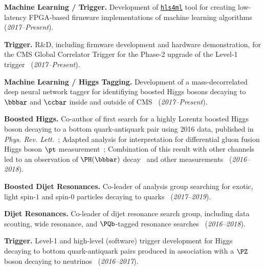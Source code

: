 \documentclass{res}
\begin{document}
\begin{resume}
  \textbf{Machine Learning / Trigger.} Development of \href{https://fastmachinelearning.org/hls4ml/}{\texttt{hls4ml}} tool for creating low-latency FPGA-based firmware implementations of machine learning algorithms~\cite{Elabd:2021lgo,Deiana:2021niw,Govorkova:2021utb,Iiyama:2020wap,Heintz:2020soy,DiGuglielmo:2020eqx,Summers:2020xiy,neurips2019_hls4ml,Duarte:2018ite} (\textit{2017--Present}).

  \textbf{Trigger.} R\&D, including firmware development and hardware demonstration, for the CMS Global Correlator Trigger for the Phase-2 upgrade of the Level-1 trigger~\cite{CERN-LHCC-2020-004} (\emph{2017--Present}).

  \textbf{Machine Learning / Higgs Tagging.} Development of a mass-decorrelated deep neural network tagger for identifiying boosted Higgs bosons decaying to $\bbbar$ and $\ccbar$ inside and outside of  CMS~\cite{Moreno:2019neq,Moreno:2019bmu,neurips2019_hbb,CMS-DP-2018-046} (\textit{2017--Present}).

  \textbf{Boosted Higgs.} Co-author of first search for a highly Lorentz boosted Higgs boson decaying to a bottom quark-antiquark pair using 2016 data, published in \emph{Phys. Rev. Lett.}~\cite{Sirunyan:2017dgc}; Adapted analysis for interpretation for differential gluon fusion Higgs boson $\pt$ measurement~\cite{Sirunyan:2018sgc}; Combination of this result with other channels led to an observation of $\PH(\bbbar)$ decay~\cite{Sirunyan:2018kst} and other measurements~\cite{Sirunyan:2018koj} (\textit{2016--2018}).

  \textbf{Boosted Dijet Resonances.} Co-leader of analysis group searching for exotic, light spin-$1$ and spin-$0$ particles decaying to quarks~\cite{Sirunyan:2019vxa,Sirunyan:2019sgo,Sirunyan:2018ikr,Sirunyan:2017nvi} (\textit{2017--2019}).

  \textbf{Dijet Resonances.} Co-leader of dijet resonance search group, including data scouting, wide resonance, and $\PQb$-tagged resonance searches~\cite{Sirunyan:2019pnb,Sirunyan:2019vgj,CMS-PAS-EXO-17-026,Duarte:2018bsd,Sirunyan:2018xlo,Sirunyan:2016iap} (\textit{2016--2018}).

  \textbf{Trigger.} Level-1 and high-level (software) trigger development for Higgs decaying to bottom quark-antiquark pairs produced in association with a $\PZ$ boson decaying to neutrinos~\cite{Sirunyan:2018kst} (\textit{2016--2017}).

\end{resume}
\end{document}
